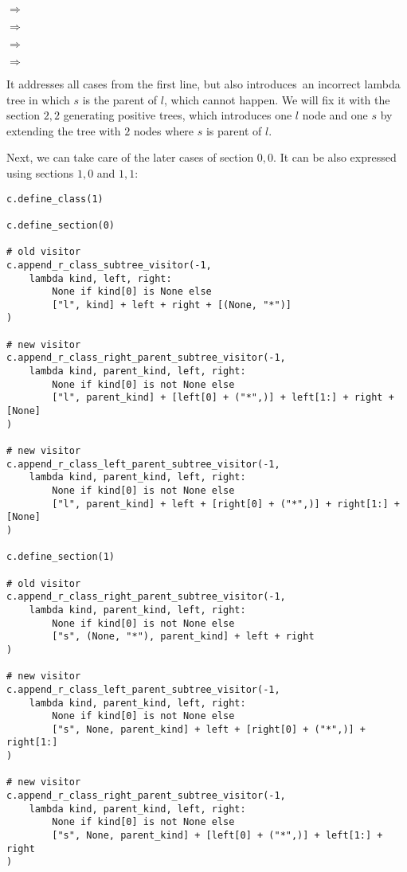 \documentclass[final]{article}
\theoremstyle{definition}
\theoremstyle{definition}
\theoremstyle{remark}
\newcommand{\includeinlinesvg}[2]{\begin{minipage}{#1\textwidth}\end{minipage}}
\begin{document}
\includeinlinesvg{.24}{lambda__trees_100__0_base}\(\Rightarrow\)\includeinlinesvg{.24}{lambda__trees_100__0}%
\includeinlinesvg{.24}{lambda__trees_100__1_base}\(\Rightarrow\)\includeinlinesvg{.24}{lambda__trees_100__1}%

\includeinlinesvg{.24}{lambda__trees_100__2_base}\(\Rightarrow\)\includeinlinesvg{.24}{lambda__trees_100__2}%
\includeinlinesvg{.24}{lambda__trees_100__3_base}\(\Rightarrow\)\includeinlinesvg{.24}{lambda__trees_100__3}%

It addresses all cases from the first line, but also introduces~an incorrect lambda tree in which \(s\) is the parent of \(l\), which cannot happen. We will fix it with the section \(2,2\) generating positive trees, which introduces one \(l\) node and one \(s\) by extending the tree with \(2\) nodes where \(s\) is parent of \(l\).

Next, we can take care of the later cases of section \(0, 0\). It can be also expressed using sections \(1, 0\) and \(1, 1\):

\begin{lstlisting}
c.define_class(1)

c.define_section(0)

# old visitor
c.append_r_class_subtree_visitor(-1,
    lambda kind, left, right:
        None if kind[0] is None else
        ["l", kind] + left + right + [(None, "*")]
)

# new visitor
c.append_r_class_right_parent_subtree_visitor(-1,
    lambda kind, parent_kind, left, right:
        None if kind[0] is not None else
        ["l", parent_kind] + [left[0] + ("*",)] + left[1:] + right + [None]
)

# new visitor
c.append_r_class_left_parent_subtree_visitor(-1,
    lambda kind, parent_kind, left, right:
        None if kind[0] is not None else
        ["l", parent_kind] + left + [right[0] + ("*",)] + right[1:] + [None]
)

c.define_section(1)

# old visitor
c.append_r_class_right_parent_subtree_visitor(-1,
    lambda kind, parent_kind, left, right:
        None if kind[0] is not None else
        ["s", (None, "*"), parent_kind] + left + right
)

# new visitor
c.append_r_class_left_parent_subtree_visitor(-1,
    lambda kind, parent_kind, left, right:
        None if kind[0] is not None else
        ["s", None, parent_kind] + left + [right[0] + ("*",)] + right[1:]
)

# new visitor
c.append_r_class_right_parent_subtree_visitor(-1,
    lambda kind, parent_kind, left, right:
        None if kind[0] is not None else
        ["s", None, parent_kind] + [left[0] + ("*",)] + left[1:] + right
)
\end{lstlisting}
\end{document}
